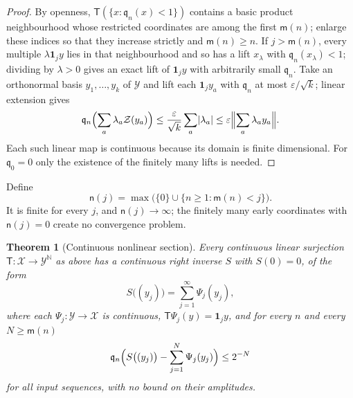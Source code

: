 \documentclass[11pt,a4paper]{article}
\numberwithin{equation}{section}
\newtheorem{theorem}{Theorem}[section]
\theoremstyle{definition}
\theoremstyle{remark}
\theoremstyle{plain}
\newcommand{\abs}[1]{\lvert #1\rvert}
\begin{document}
\begin{proof}
By openness, $\mathsf T(\{x:\mathfrak q_n(x)<1\})$ contains a basic product
neighbourhood whose restricted coordinates are among the first $\mathsf m(n)$;
enlarge these indices so that they increase strictly and $\mathsf m(n)\ge n$.
If $j>\mathsf m(n)$, every multiple $\lambda\mathbf 1_jy$ lies in that
neighbourhood and so has a lift $x_\lambda$ with $\mathfrak q_n(x_\lambda)<1$;
dividing by $\lambda>0$ gives an exact lift of $\mathbf 1_jy$ with arbitrarily
small $\mathfrak q_n$. Take an orthonormal basis $y_1,\dots,y_k$ of $\mathcal
Y$ and lift each $\mathbf 1_jy_a$ with $\mathfrak q_n$ at most
$\varepsilon/\sqrt k$; linear extension gives
\[
 \mathfrak q_n\Bigl(\sum_a\lambda_a\mathcal Z(y_a)\Bigr)
 \le\frac{\varepsilon}{\sqrt k}\sum_a\abs{\lambda_a}
 \le\varepsilon\Bigl\lVert\sum_a\lambda_ay_a\Bigr\rVert .
\]
Each such linear map is continuous because its domain is finite dimensional.
For $\mathfrak q_0=0$ only the existence of the finitely many lifts is needed.
\end{proof}

Define
\begin{equation}\label{h:eq:nj}
 \mathsf n(j)=\max\bigl(\{0\}\cup\{n\ge1:\mathsf m(n)<j\}\bigr).
\end{equation}
It is finite for every $j$, and $\mathsf n(j)\to\infty$; the finitely many early
coordinates with $\mathsf n(j)=0$ create no convergence problem.

\begin{theorem}[Continuous nonlinear section]\label{h:thm:nonlinear}
Every continuous linear surjection $\mathsf T:\mathcal X\to\mathcal Y^{\mathbb N}$
as above has a continuous right inverse $S$ with $S(0)=0$, of the form
\begin{equation}\label{h:eq:nonlinear-series}
 S\bigl((y_j)\bigr)=\sum_{j=1}^\infty\Psi_j(y_j),
\end{equation}
where each $\Psi_j:\mathcal Y\to\mathcal X$ is continuous,
$\mathsf T\Psi_j(y)=\mathbf 1_jy$, and for every $n$ and every
$N\ge\mathsf m(n)$
\begin{equation}\label{h:eq:nonlinear-tail}
 \mathfrak q_n\Bigl(S\bigl((y_j)\bigr)-\sum_{j=1}^N\Psi_j(y_j)\Bigr)\le2^{-N}
\end{equation}
for all input sequences, with no bound on their amplitudes.
\end{theorem}
\end{document}
